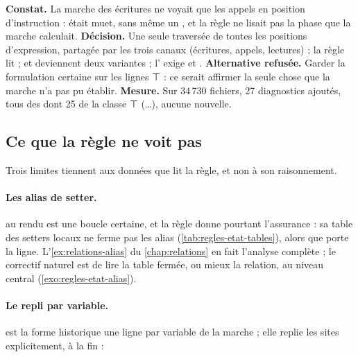 \begin{decision}
\textbf{Constat.} La marche des écritures ne voyait que les appels en position d'instruction :  était muet, sans même un , et la règle ne lisait pas la phase que la marche calculait. \textbf{Décision.} Une seule traversée de toutes les positions d'expression, partagée par les trois canaux (écritures, appels, lectures) ; la règle lit  ;  et  deviennent deux variantes ; l'\Error{} exige  et . \textbf{Alternative refusée.} Garder la formulation certaine sur les lignes ⊤ : ce serait affirmer \og la seule chose que la marche n'a pas pu établir\fg. \textbf{Mesure.} Sur 34\,730 fichiers, 27 diagnostics ajoutés, tous des \Warning{} dont 25 de la classe ⊤ (\ldots), aucune \Error{} nouvelle.
\end{decision}

\subsection{Ce que la règle ne voit pas}

Trois limites tiennent aux données que lit la règle, et non à son raisonnement.

\paragraph{Les alias de setter.}  au rendu est une boucle certaine, et la règle donne pourtant l'assurance  : sa table des setters locaux ne ferme pas les alias (\cref{tab:regles-etat-tables}), alors que  porte la ligne. L'\cref{ex:relations-alias} du \cref{chap:relations} en fait l'analyse complète ; le correctif naturel est de lire la table fermée, ou mieux la relation, au niveau central (\cref{exo:regles-etat-alias}).

\paragraph{Le repli par variable.}  est la forme historique \og une ligne par variable\fg{} de la marche ; elle replie les sites explicitement, à la fin :


